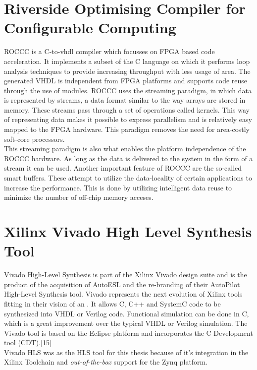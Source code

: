 \section{Riverside Optimising Compiler for Configurable Computing} 
ROCCC is a C-to-vhdl compiler which focusses on FPGA based code acceleration. It implements a subset of the C language on which it performs loop analysis techniques to provide increasing throughput with less usage of area\cite{martin_high-level_2009}. The generated VHDL is independent from FPGA platforms and supports code reuse through the use of modules. 
ROCCC uses the streaming paradigm, in which data is represented by streams, a data format similar to the way arrays are stored in memory. These streams pass through a set of operations called kernels. This way of representing data makes it possible to express parallelism and is relatively easy mapped to the FPGA hardware. This paradigm removes the need for area-costly soft-core processors\cite{buyukkurt_impact_2006}.\\
This streaming paradigm is also what enables the platform independence of the ROCCC hardware. As long as the data is delivered to the system in the form of a stream it can be used.
Another important feature of ROCCC are the so-called smart buffers. These attempt to utilize the data-locality of certain applications to increase the performance. This is done by utilizing intelligent data reuse to minimize the number of off-chip memory acceses. 

\section{Xilinx Vivado High Level Synthesis Tool}
\label{sec:vivado_HLS}
Vivado High-Level Synthesis is part of the Xilinx Vivado design suite and is the product of the acquisition of AutoESL and the re-branding of their AutoPilot High-Level Synthesis tool. Vivado represents the next evolution of Xilinx tools fitting in their vision of an .  It allows C, C++ and SystemC code to be synthesized into VHDL or Verilog code. Functional simulation can be done in C, which is a great improvement over the typical VHDL or Verilog simulation. The Vivado tool is based on the Eclipse platform and incorporates the C Development tool (CDT).[15]
\\
Vivado HLS was as the HLS tool for this thesis because of it's integration in the Xilinx Toolchain and \emph{out-of-the-box} support for the Zynq platform.

\subsection{
}
